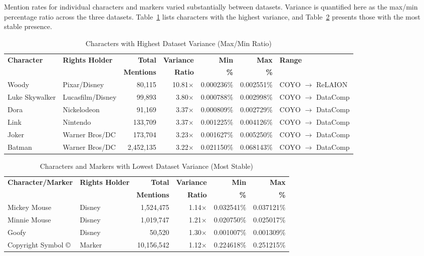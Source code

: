 \documentclass[11pt]{article}
\begin{document}
Mention rates for individual characters and markers varied substantially between datasets. Variance is quantified here as the max/min percentage ratio across the three datasets. Table~\ref{tab:high_variance} lists characters with the highest variance, and Table~\ref{tab:low_variance} presents those with the most stable presence.

\begin{table}[htbp]
\centering
\caption{Characters with Highest Dataset Variance (Max/Min Ratio)}
\label{tab:high_variance}
\small
\begin{tabular}{llrrrrl}
\toprule
\textbf{Character} & \textbf{Rights Holder} & \textbf{Total} & \textbf{Variance} & \textbf{Min} & \textbf{Max} & \textbf{Range} \\
 & & \textbf{Mentions} & \textbf{Ratio} & \textbf{\%} & \textbf{\%} & \\
\midrule
Woody & Pixar/Disney & 80,115 & 10.81$\times$ & 0.000236\% & 0.002551\% & COYO $\to$ ReLAION \\
Luke Skywalker & Lucasfilm/Disney & 99,893 & 3.80$\times$ & 0.000788\% & 0.002998\% & COYO $\to$ DataComp \\
Dora & Nickelodeon & 91,169 & 3.37$\times$ & 0.000809\% & 0.002729\% & COYO $\to$ DataComp \\
Link & Nintendo & 133,709 & 3.37$\times$ & 0.001225\% & 0.004126\% & COYO $\to$ DataComp \\
Joker & Warner Bros/DC & 173,704 & 3.23$\times$ & 0.001627\% & 0.005250\% & COYO $\to$ DataComp \\
Batman & Warner Bros/DC & 2,452,135 & 3.22$\times$ & 0.021150\% & 0.068143\% & COYO $\to$ DataComp \\
\bottomrule
\end{tabular}
\end{table}

\begin{table}[htbp]
\centering
\caption{Characters and Markers with Lowest Dataset Variance (Most Stable)}
\label{tab:low_variance}
\small
\begin{tabular}{llrrrr}
\toprule
\textbf{Character/Marker} & \textbf{Rights Holder} & \textbf{Total} & \textbf{Variance} & \textbf{Min} & \textbf{Max} \\
 & & \textbf{Mentions} & \textbf{Ratio} & \textbf{\%} & \textbf{\%} \\
\midrule
Mickey Mouse & Disney & 1,524,475 & 1.14$\times$ & 0.032541\% & 0.037121\% \\
Minnie Mouse & Disney & 1,019,747 & 1.21$\times$ & 0.020750\% & 0.025017\% \\
Goofy & Disney & 50,520 & 1.30$\times$ & 0.001007\% & 0.001309\% \\
Copyright Symbol © & Marker & 10,156,542 & 1.12$\times$ & 0.224618\% & 0.251215\% \\
\bottomrule
\end{tabular}
\end{table}
\end{document}
